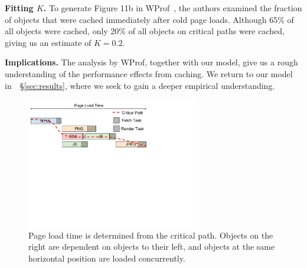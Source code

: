 %

{\bf Fitting $K$.} To generate Figure 11b in
WProf~\cite{wang2013demystifying}, the authors examined
the fraction of objects that were cached immediately after cold page loads.
Although 65\% of all objects were cached, only 20\%
of all objects on critical paths were cached, giving us an estimate of
$K=0.2$.



{\bf Implications.} The analysis by WProf, together with our model, give us a
rough understanding of the performance effects from caching. We return to
our model in~~\S\ref{sec:results}, where we seek to gain a deeper empirical understanding.
\begin{figure}[t]
    \hspace{-10pt}
    \includegraphics[width=3in]{../images/plt-diagram.pdf}
    \caption[]{\label{fig:plt-diagram} Page load time is determined from the critical path. Objects on the right are dependent on objects to their left, and objects at the same horizontal position are loaded concurrently.}
\end{figure}